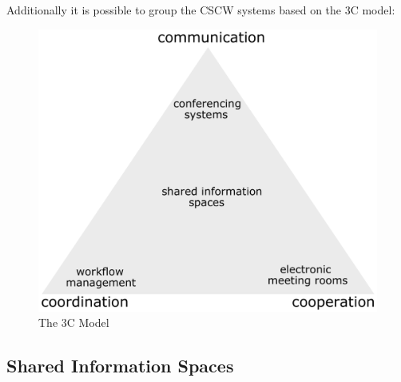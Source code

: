 Additionally it is possible to group the CSCW systems based on the 3C model: \\

\begin{figure}[H]
 \centering
 \includegraphics[width=0.8\columnwidth]{images/3C-model.pdf}
 \caption[The 3C Model]{The 3C Model \citep{Koch2008}}
\label{fig:images_cscw_3C_model}
\end{figure}


\subsection{Shared Information Spaces}
\label{sec:cscw_shared_spaces}


